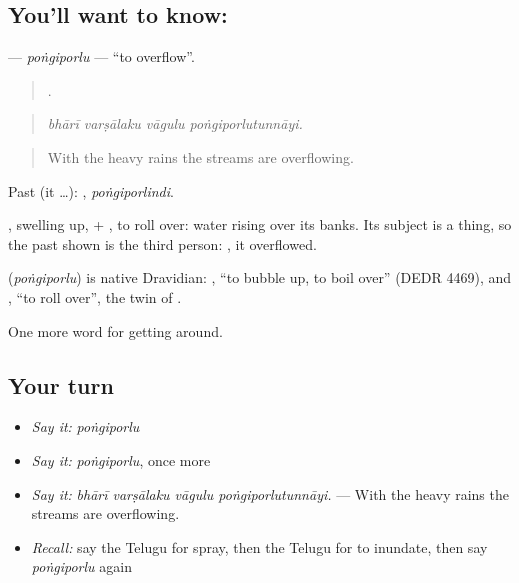 \subsection*{You'll want to know: }
\textbf{} — \emph{poṅgiporlu} — \textquotedblleft{}to overflow\textquotedblright{}.

\begin{quote}
   .
\end{quote}

\begin{quote}
\emph{bhārī varṣālaku vāgulu poṅgiporlutunnāyi.}
\end{quote}

\begin{quote}
With the heavy rains the streams are overflowing.
\end{quote}

Past (it …): , \emph{poṅgiporlindi}.

, swelling up, + , to roll over: water rising over its banks. Its subject is a thing, so the past shown is the third person: , it overflowed.

\begin{cousinweb}
\textbf{} (\emph{poṅgiporlu}) is native Dravidian: , \textquotedblleft{}to bubble up, to boil over\textquotedblright{} (DEDR 4469), and , \textquotedblleft{}to roll over\textquotedblright{}, the twin of .
\end{cousinweb}

\begin{grammarlens}[title={What you've built}]
One more word for getting around.
\end{grammarlens}

\subsection*{Your turn}
\begin{itemize}
\raggedright
  \item \emph{Say it:} \emph{poṅgiporlu}
  \item \emph{Say it:} \emph{poṅgiporlu}, once more
  \item \emph{Say it:} \emph{bhārī varṣālaku vāgulu poṅgiporlutunnāyi.} — With the heavy rains the streams are overflowing.
  \item \emph{Recall:} say the Telugu for spray, then the Telugu for to inundate, then say \emph{poṅgiporlu} again
\end{itemize}

